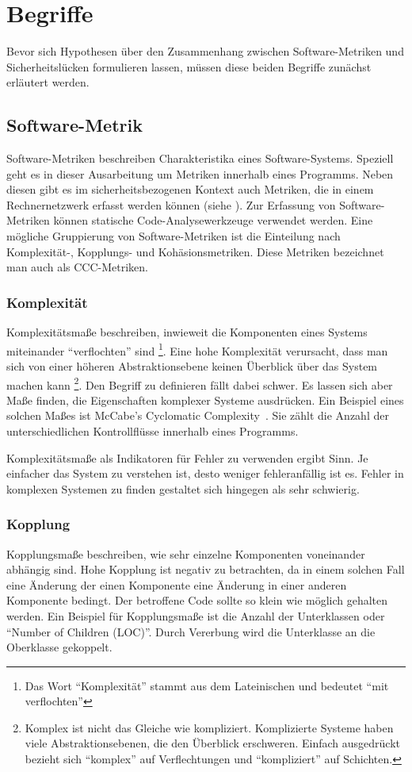 \section{Begriffe}
\label{sec:begriffe}
Bevor sich Hypothesen über den Zusammenhang zwischen Software-Metriken und Sicherheitslücken formulieren lassen, müssen diese beiden Begriffe zunächst erläutert werden.

\subsection{Software-Metrik}
Software-Metriken beschreiben Charakteristika eines Software-Systems.
Speziell geht es in dieser Ausarbeitung um Metriken innerhalb eines Programms.
Neben diesen gibt es im sicherheitsbezogenen Kontext auch Metriken, die in einem Rechnernetzwerk erfasst werden können (siehe \cite{cheng2014}).
Zur Erfassung von Software-Metriken können statische Code-Analysewerkzeuge verwendet werden.
Eine mögliche Gruppierung von Software-Metriken ist die Einteilung nach Komplexität-, Kopplungs- und Kohäsionsmetriken.
Diese Metriken bezeichnet man auch als CCC-Metriken.

\subsubsection{Komplexität}
Komplexitätsmaße beschreiben, inwieweit die Komponenten eines Systems miteinander "`verflochten"' sind
\footnote{Das Wort "`Komplexität"' stammt aus dem Lateinischen und bedeutet "`mit verflochten"'}.
Eine hohe Komplexität verursacht, dass man sich von einer höheren Abstraktionsebene keinen Überblick über das System machen kann
\footnote{Komplex ist nicht das Gleiche wie kompliziert. Komplizierte Systeme haben viele Abstraktionsebenen, die den Überblick erschweren. Einfach ausgedrückt bezieht sich "`komplex"' auf Verflechtungen und "`kompliziert"' auf Schichten.}.
Den Begriff zu definieren fällt dabei schwer.
Es lassen sich aber Maße finden, die Eigenschaften komplexer Systeme ausdrücken.
Ein Beispiel eines solchen Maßes ist McCabe's Cyclomatic Complexity~\cite{mccabe1976}.
Sie zählt die Anzahl der unterschiedlichen Kontrollflüsse innerhalb eines Programms.

Komplexitätsmaße als Indikatoren für Fehler zu verwenden ergibt Sinn.
Je einfacher das System zu verstehen ist, desto weniger fehleranfällig ist es.
Fehler in komplexen Systemen zu finden gestaltet sich hingegen als sehr schwierig.

\subsubsection{Kopplung}
Kopplungsmaße beschreiben, wie sehr einzelne Komponenten voneinander abhängig sind.
Hohe Kopplung ist negativ zu betrachten, da in einem solchen Fall eine Änderung der einen Komponente eine Änderung in einer anderen Komponente bedingt.
Der betroffene Code sollte so klein wie möglich gehalten werden.
Ein Beispiel für Kopplungsmaße ist die Anzahl der Unterklassen oder "`Number of Children (LOC)"'.
Durch Vererbung wird die Unterklasse an die Oberklasse gekoppelt.

